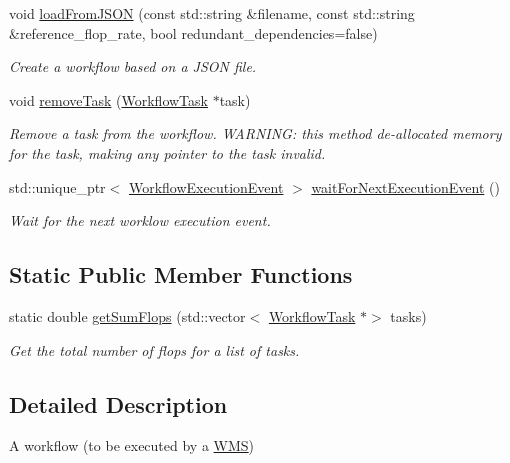 \begin{DoxyCompactItemize}
void \hyperlink{classwrench_1_1_workflow_aa0b24ef757bfaf6cffcd61256331a33d}{load\+From\+J\+S\+ON} (const std\+::string \&filename, const std\+::string \&reference\+\_\+flop\+\_\+rate, bool redundant\+\_\+dependencies=false)
\begin{DoxyCompactList}\small\item\em Create a workflow based on a J\+S\+ON file. \end{DoxyCompactList}\item 
void \hyperlink{classwrench_1_1_workflow_af2361b641261ea13079902bef91e11f4}{remove\+Task} (\hyperlink{classwrench_1_1_workflow_task}{Workflow\+Task} $\ast$task)
\begin{DoxyCompactList}\small\item\em Remove a task from the workflow. W\+A\+R\+N\+I\+NG\+: this method de-\/allocated memory for the task, making any pointer to the task invalid. \end{DoxyCompactList}\item 
std\+::unique\+\_\+ptr$<$ \hyperlink{classwrench_1_1_workflow_execution_event}{Workflow\+Execution\+Event} $>$ \hyperlink{classwrench_1_1_workflow_a778d5dc2bba590235b3372828e286546}{wait\+For\+Next\+Execution\+Event} ()
\begin{DoxyCompactList}\small\item\em Wait for the next worklow execution event. \end{DoxyCompactList}\end{DoxyCompactItemize}
\subsection*{Static Public Member Functions}
\begin{DoxyCompactItemize}
\item 
static double \hyperlink{classwrench_1_1_workflow_a2d6acb74faf1153f491bf7b52847ce82}{get\+Sum\+Flops} (std\+::vector$<$ \hyperlink{classwrench_1_1_workflow_task}{Workflow\+Task} $\ast$$>$ tasks)
\begin{DoxyCompactList}\small\item\em Get the total number of flops for a list of tasks. \end{DoxyCompactList}\end{DoxyCompactItemize}


\subsection{Detailed Description}
A workflow (to be executed by a \hyperlink{classwrench_1_1_w_m_s}{W\+MS}) 

